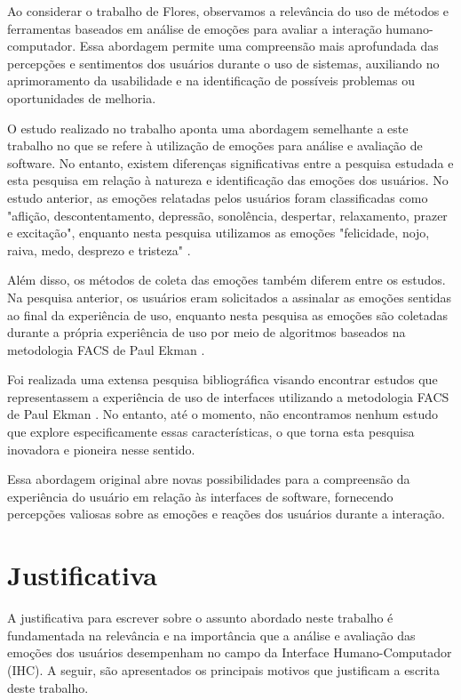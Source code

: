 Ao considerar o trabalho de Flores, observamos a relevância do uso de métodos e ferramentas baseados em análise de emoções para avaliar a interação humano-computador. Essa abordagem permite uma compreensão mais aprofundada das percepções e sentimentos dos usuários durante o uso de sistemas, auxiliando no aprimoramento da usabilidade e na identificação de possíveis problemas ou oportunidades de melhoria.

O estudo realizado no trabalho aponta uma abordagem semelhante a este trabalho no que se refere à utilização de emoções para análise e avaliação de software. No entanto, existem diferenças significativas entre a pesquisa estudada e esta pesquisa em relação à natureza e identificação das emoções dos usuários. No estudo anterior, as emoções relatadas pelos usuários foram classificadas como "aflição, descontentamento, depressão, sonolência, despertar, relaxamento, prazer e excitação", enquanto nesta pesquisa utilizamos as emoções "felicidade, nojo, raiva, medo, desprezo e tristeza" \cite{4}.

Além disso, os métodos de coleta das emoções também diferem entre os estudos. Na pesquisa anterior, os usuários eram solicitados a assinalar as emoções sentidas ao final da experiência de uso, enquanto nesta pesquisa as emoções são coletadas durante a própria experiência de uso por meio de algoritmos baseados na metodologia FACS de Paul Ekman \cite{5}.

Foi realizada uma extensa pesquisa bibliográfica visando encontrar estudos que representassem a experiência de uso de interfaces utilizando a metodologia FACS de Paul Ekman \cite{5}. No entanto, até o momento, não encontramos nenhum estudo que explore especificamente essas características, o que torna esta pesquisa inovadora e pioneira nesse sentido.

Essa abordagem original abre novas possibilidades para a compreensão da experiência do usuário em relação às interfaces de software, fornecendo percepções valiosas sobre as emoções e reações dos usuários durante a interação.

\section{Justificativa}

A justificativa para escrever sobre o assunto abordado neste trabalho é fundamentada na relevância e na importância que a análise e avaliação das emoções dos usuários desempenham no campo da Interface Humano-Computador (IHC). A seguir, são apresentados os principais motivos que justificam a escrita deste trabalho.


